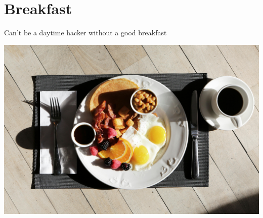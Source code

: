 \pagebreak
\chapter{Breakfast}

Can't be a daytime hacker without a good breakfast
   
\centering
\includegraphics[scale=0.08]{images/pexels-photo-101533.jpg}
